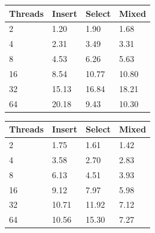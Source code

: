 \documentclass[conference, compsoc]{IEEEtran}
\begin{document}
\par\vspace{\baselineskip}
\begin{figure}[H]
\begin{center}
 \label{tab:memsqlScaling}
  \begin{tabular}{  l  l  l  l }
    \midrule
    \bf Threads & \bf Insert & \bf Select & \bf Mixed \\ \midrule
     2 & 1.20 & 1.90 & 1.68 \\ \midrule
     4 & 2.31 & 3.49 & 3.31 \\ \midrule
     8 & 4.53 & 6.26 & 5.63 \\ \midrule
     16 & 8.54 & 10.77 & 10.80 \\ \midrule
     32 & 15.13 & 16.84 & 18.21 \\ \midrule
     64 & 20.18 & 9.43 & 10.30 \\ \midrule
  \end{tabular}
\end{center}
\end{figure}

\par\vspace{\baselineskip}
\begin{figure}[H]
\begin{center}
 \label{tab:voltScaling}
  \begin{tabular}{  l  l  l  l }
    \midrule
    \bf Threads & \bf Insert & \bf Select & \bf Mixed \\ \midrule
     2 & 1.75 & 1.61 & 1.42 \\ \midrule
     4 & 3.58 & 2.70 & 2.83 \\ \midrule
     8 & 6.13 & 4.51 & 3.93 \\ \midrule
     16 & 9.12 & 7.97 & 5.98 \\ \midrule
     32 & 10.71 & 11.92 & 7.12 \\ \midrule
     64 & 10.56 & 15.30 & 7.27 \\ \midrule
  \end{tabular}
\end{center}
\end{figure}
\end{document}
